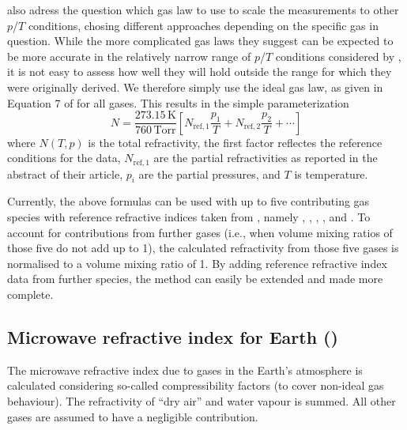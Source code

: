 \citet{newell65:_absolute_jap} also adress the question which gas law
to use to scale the measurements to other $p$/$T$ conditions, chosing different
approaches depending on the specific gas in question. While the more complicated
gas laws they suggest can be expected to be more
accurate in the relatively narrow range of $p$/$T$ conditions
considered by \citet{newell65:_absolute_jap}, it is not easy to
assess how well they will hold outside the range for which they were
originally derived. We therefore simply use the ideal gas
law, as given in Equation 7 of \citet{newell65:_absolute_jap} for all
gases. This results in the simple parameterization
\begin{equation}
  \label{eq:N_density2}
  N = \frac{273.15\,\mathrm{K}}{760\,\mathrm{Torr}}  
           \left[
           N_{\mathrm{ref},1} \frac{p_1}{T} + 
           N_{\mathrm{ref},2} \frac{p_2}{T} + \cdots
           \right]
\end{equation}
where $ N(T,p)$ is the total refractivity, the
first factor reflectes the reference conditions for the
\citet{newell65:_absolute_jap} data, $N_{\mathrm{ref},1}$ are the
partial refractivities as reported in the abstract of their
article, $p_i$ are the partial pressures, and $T$ is temperature.

Currently, the above formulas can be used with up to five contributing gas
species with reference refractive indices taken from
\citet{newell65:_absolute_jap}, namely , , ,
, and . To account for contributions from further gases
(i.e., when volume mixing ratios of those five do not add up to 1), the
calculated refractivity from those five gases is normalised to a volume mixing
ratio of 1. By adding reference refractive index data from further species, the
method can easily be extended and made more complete.

\subsection{Microwave refractive index for Earth ()}
 \label{sec:rindex:thayer}
The microwave refractive index due to gases in the Earth’s atmosphere is
calculated considering so-called compressibility factors (to cover non-ideal gas behaviour). The refractivity of ``dry air'' and water vapour is summed. All other gases are assumed to have a negligible contribution. \citep{thayer74_improved_rs}

